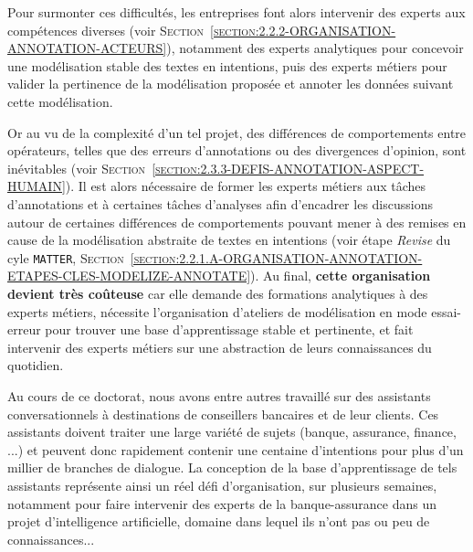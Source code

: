	Pour surmonter ces difficultés, les entreprises font alors intervenir des experts aux compétences diverses (voir \textsc{Section~\ref{section:2.2.2-ORGANISATION-ANNOTATION-ACTEURS}}), notamment des experts analytiques pour concevoir une modélisation stable des textes en intentions, puis des experts métiers pour valider la pertinence de la modélisation proposée et annoter les données suivant cette modélisation.
	
	
	Or au vu de la complexité d'un tel projet, des différences de comportements entre opérateurs, telles que des erreurs d'annotations ou des divergences d'opinion, sont inévitables (voir \textsc{Section~\ref{section:2.3.3-DEFIS-ANNOTATION-ASPECT-HUMAIN}}).
	Il est alors nécessaire de former les experts métiers aux tâches d'annotations et à certaines tâches d'analyses afin d'encadrer les discussions autour de certaines différences de comportements pouvant mener à des remises en cause de la modélisation abstraite de textes en intentions (voir étape \textit{Revise} du cyle \texttt{MATTER}, \textsc{Section~\ref{section:2.2.1.A-ORGANISATION-ANNOTATION-ETAPES-CLES-MODELIZE-ANNOTATE}}).
	Au final, \textbf{cette organisation devient très coûteuse} car elle demande des formations analytiques à des experts métiers, nécessite l'organisation d'ateliers de modélisation en mode essai-erreur pour trouver une base d'apprentissage stable et pertinente, et fait intervenir des experts métiers sur une abstraction de leurs connaissances du quotidien.
	
	\begin{leftBarExamples}
		Au cours de ce doctorat, nous avons entre autres travaillé sur des assistants conversationnels à destinations de conseillers bancaires et de leur clients.
		Ces assistants doivent traiter une large variété de sujets (banque, assurance, finance, ...) et peuvent donc rapidement contenir une centaine d'intentions pour plus d'un millier de branches de dialogue.
		La conception de la base d'apprentissage de tels assistants représente ainsi un réel défi d'organisation, sur plusieurs semaines, notamment pour faire intervenir des experts de la banque-assurance dans un projet d'intelligence artificielle, domaine dans lequel ils n'ont pas ou peu de connaissances...
	\end{leftBarExamples}
	
